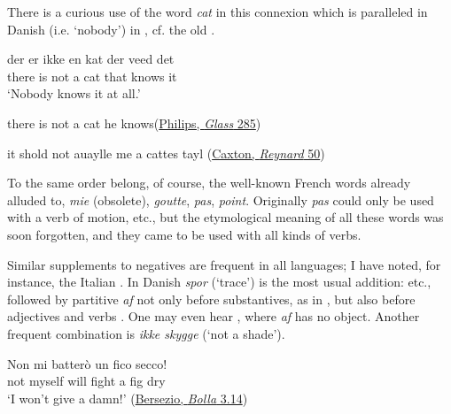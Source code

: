 There  is a curious use of the word \textit{cat} in this connexion which is paralleled in Danish  (i.e. `nobody') in , cf. the old .

\ea \label{ex:02-15}
\gll der er ikke en kat der veed det\\
 there is not a cat that knows it\\
\glt `Nobody knows it at all.'
\z

\ea \label{ex:02-16}
there is not a cat he knows\hfill(\href{https://archive.org/details/asinalookinggla00philgoog/page/n288/mode/2up?q=%22there+is+not+a+cat+he+knows%22&view=theater}{Philips, \textit{Glass} 285})
\z

\ea \label{ex:02-17}
it shold not auaylle me a cattes tayl \hfill(\href{https://archive.org/details/TheHistoryOfReynardTheFoxArber/page/n79/mode/2up?q=%22not+auaylle+me%22&view=theater}{Caxton, \textit{Reynard} 50})
\z{}

To the same order belong, of course, the well-known French words already alluded to, \textit{mie} (obsolete), \textit{goutte}, \textit{pas}, \textit{point}. Originally \textit{pas} could only be used with a verb of motion, etc., but the etymological meaning of all these words was soon forgotten, and they came to be used with all kinds of verbs.

Similar supplements to negatives are frequent in all languages; I have noted, for instance, the Italian . In Danish \textit{spor} (`trace') is the most usual addition:  etc., followed by partitive \textit{af} not only before substantives, as in , but also before adjectives and verbs . One may even hear , where \textit{af} has no object. Another frequent combination is \textit{ikke skygge} (`not a shade').

\ea \label{ex:02-18}
\gll Non mi batterò un fico secco!\\
 not myself {will fight} a fig dry\\
\glt `I won't give a damn!'
\hfill(\href{https://archive.org/details/bub_gb_JUcxlkCjgNgC/page/n85/mode/2up?q=%22non+mi+batter%C3%B2+un+fico+secco%22&view=theater}{Bersezio, \textit{Bolla} 3.14})

